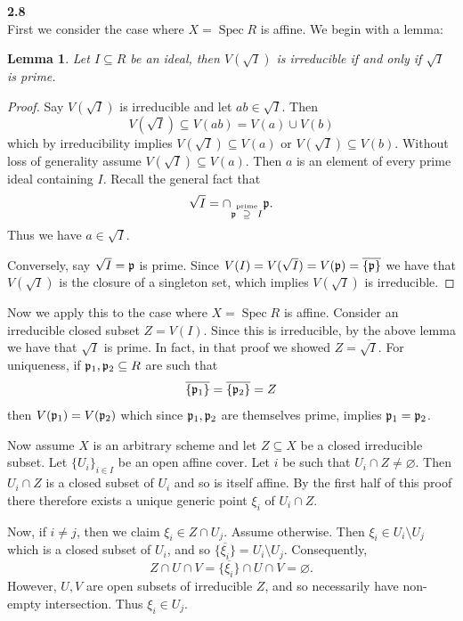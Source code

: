 \documentclass[12pt]{article}
\numberwithin{thm}{subsection}
\numberwithin{defn}{subsection}
\newtheorem{lemma}{Lemma}
\numberwithin{lemma}{subsection}
\numberwithin{example}{subsection}
\numberwithin{notation}{subsection}
\numberwithin{cor}{subsection}
\numberwithin{remark}{subsection}
\numberwithin{condition}{subsection}
\numberwithin{question}{subsection}
\numberwithin{construction}{subsection}
\numberwithin{construction}{subsection}
\numberwithin{construction}{subsection}
\begin{document}
%
\textbf{2.8}\\
First we consider the case where $X = \operatorname{Spec}R$ is affine. We begin with a lemma:
\begin{lemma}
    Let $I \subseteq R$ be an ideal, then $V(\sqrt{I})$ is irreducible if and only if $\sqrt{I}$ is prime.
\end{lemma}
\begin{proof}
    Say $V(\sqrt{I})$ is irreducible and let $ab \in \sqrt{I}$. Then
    \begin{equation}
        V(\sqrt{I}) \subseteq V(ab) = V(a) \cup V(b)
    \end{equation}
    which by irreducibility implies $V(\sqrt{I}) \subseteq V(a)$ or $V(\sqrt{I}) \subseteq V(b)$. Without loss of generality assume $V(\sqrt{I}) \subseteq V(a)$. Then $a$ is an element of every prime ideal containing $I$. Recall the general fact that
    \begin{equation}
        \sqrt{I} = \cap_{\frak{p} \stackrel{\text{prime}}{\supseteq}I}\frak{p}.
    \end{equation}
    Thus we have $a \in \sqrt{I}$.

    Conversely, say $\sqrt{I} = \frak{p}$ is prime. Since $V(I) = V(\sqrt{I}) = V(\frak{p}) = \overline{\{\frak{p}\}}$ we have that $V(\sqrt{I})$ is the closure of a singleton set, which implies $V(\sqrt{I})$ is irreducible.
\end{proof}
Now we apply this to the case where $X = \operatorname{Spec}R$ is affine. Consider an irreducible closed subset $Z = V(I)$. Since this is irreducible, by the above lemma we have that $\sqrt{I}$ is prime. In fact, in that proof we showed $Z = \overline{\sqrt{I}}$. For uniqueness, if $\frak{p}_1, \frak{p}_2 \subseteq R$ are such that
\begin{equation}
    \overline{\{\frak{p}_1\}} = \overline{\{\frak{p}_2\}} = Z
\end{equation}
then $V(\frak{p}_1) = V(\frak{p}_2)$ which since $\frak{p}_1, \frak{p}_2$ are themselves prime, implies $\frak{p}_1 = \frak{p}_2$.

Now assume $X$ is an arbitrary scheme and let $Z \subseteq X$ be a closed irreducible subset. Let $\{U_i\}_{i \in I}$ be an open affine cover. Let $i$ be such that $U_i \cap Z \neq \varnothing$. Then $U_i \cap Z$ is a closed subset of $U_i$ and so is itself affine. By the first half of this proof there therefore exists a unique generic point $\xi_i$ of $U_i \cap Z$.

Now, if $i \neq j$, then we claim $\xi_i \in Z \cap U_j$. Assume otherwise. Then $\xi_i \in U_i \setminus U_j$ which is a closed subset of $U_i$, and so $\overline{\{\xi_i\}} = U_i \setminus U_j$. Consequently,
\begin{equation}
    Z \cap U \cap V = \overline{\{\xi_i\}} \cap U \cap V = \varnothing.
\end{equation}
However, $U,V$ are open subsets of irreducible $Z$, and so necessarily have non-empty intersection. Thus $\xi_i \in U_j$.
\end{document}
